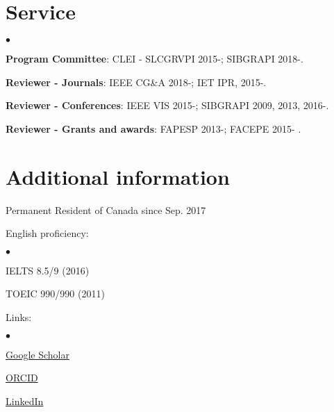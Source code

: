 \documentclass[12pt]{article}
\newcommand{\squishlist}{
 \begin{list}{$\bullet$}
  { \setlength{\itemsep}{0pt}
     \setlength{\parsep}{3pt}
     \setlength{\topsep}{3pt}
     \setlength{\partopsep}{0pt}
     \setlength{\leftmargin}{1.5em}
     \setlength{\labelwidth}{1em}
     \setlength{\labelsep}{0.5em} } }
\newcommand{\squishend}{
  \end{list}  }
\begin{document}
\section*{Service}
\squishlist
  \item{\textbf{Program Committee}: CLEI - SLCGRVPI 2015-; SIBGRAPI 2018-.}
  \item{\textbf{Reviewer - Journals}: IEEE CG\&A 2018-; IET IPR, 2015-.}
  \item{\textbf{Reviewer - Conferences}: IEEE VIS 2015-; SIBGRAPI 2009, 2013, 2016-.}
  \item{\textbf{Reviewer - Grants and awards}: FAPESP 2013-; FACEPE 2015- .}
 \squishend
 

\section*{Additional information}


Permanent Resident of Canada since Sep. 2017

\begin{minipage}{0.5\textwidth}
  English proficiency:
  \squishlist
    \item{IELTS 8.5/9 (2016)}
    \item{TOEIC 990/990 (2011)}
  \squishend
\end{minipage}
\begin{minipage}{0.5\textwidth}
  Links:
  \squishlist
    \item{\href{https://scholar.google.com.br/citations?user=0D1ExLoAAAAJ}{Google Scholar}}
    \item{\href{https://orcid.org/0000-0002-8781-583X}{ORCID}}
    \item{\href{https://www.linkedin.com/in/fabio-dias}{LinkedIn}}    
  \squishend
\end{minipage}
\end{document}
